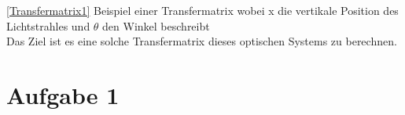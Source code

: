 \documentclass[11pt,twoside,a4paper]{article}
\begin{document}
	\ref{Transfermatrix1} Beispiel einer Transfermatrix wobei x die vertikale Position des Lichtstrahles und \(\theta\) den Winkel beschreibt \\
	
	Das Ziel ist es eine solche Transfermatrix dieses optischen Systems zu berechnen. 
	\newpage 
	\section{Aufgabe 1}
\end{document}
